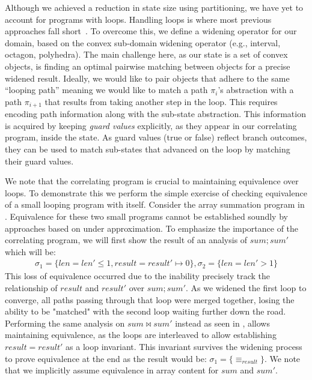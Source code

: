  Although we achieved a reduction in state size using partitioning, we have yet to account for programs with loops. Handling loops is where most previous approaches fall short~\cite{GodlinStrichman09, KawaguchiLahiriRebelo10, DwyerElbaumPerson08, EnglerRamos11}. To overcome this, we define a widening operator for our domain, based on the convex sub-domain widening operator (e.g., interval, octagon, polyhedra). The main challenge here, as our state is a set of convex objects, is finding an optimal pairwise matching between objects for a precise widened result. Ideally, we would like to pair objects that adhere to the same ``looping path'' meaning we would like to match a path $\pi_i$'s abstraction with a path $\pi_{i+1}$ that results from taking another step in the loop. This requires encoding path information along with the sub-state abstraction. This information is acquired by keeping \emph{guard values} explicitly, as they appear in our correlating program, inside the state. As guard values (true or false) reflect branch outcomes, they can be used to match sub-states that advanced on the loop by matching their guard values.

We note that the correlating program is crucial to maintaining equivalence over loops. To demonstrate this we perform the simple exercise of checking equivalence of a small looping program with itself. Consider the array summation program in . Equivalence for these two small programs cannot be established soundly by approaches based on under approximation. To emphasize the importance of the correlating program, we will first show the result of an analysis of $sum;sum'$ which will be:
{\footnotesize
\[
\begin{array}{c}
\sigma_1 = \{len = len' \leq 1, result = result' \mapsto 0\},
\sigma_2 = \{len = len' > 1\}
\end{array}
\]
}
This loss of equivalence occurred due to the inability precisely track the relationship of $result$ and $result'$ over $sum;sum'$. As we widened the first loop to converge, all paths passing through that loop were merged together, losing the ability to be "matched" with the second loop waiting further down the road. Performing the same analysis on $sum \bowtie sum'$ instead as seen in , allows maintaining equivalence, as the loops are interleaved to allow establishing $result = result'$ as a loop invariant. This invariant survives the widening process to prove equivalence at the end as the result would be:
{\footnotesize $\sigma_1 = \{\equiv_{result}\}$}.
We note that we implicitly assume equivalence in array content for $sum$ and $sum'$.


